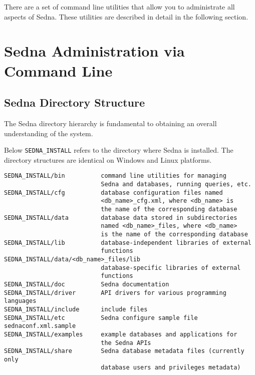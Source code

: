 \documentclass[a4paper,12pt]{article}
\begin{document}
There are a set of command line utilities that allow you to administrate all aspects of Sedna.
These utilities are described in detail in the following section.

\section{Sedna Administration via Command Line}

\subsection{Sedna Directory Structure}
\label{sec:dir-structure}
The Sedna directory hierarchy is fundamental to obtaining an overall understanding of the system. 


Below \verb!SEDNA_INSTALL! refers to the directory where Sedna is installed. The directory structures are identical on Windows and Linux platforms.

\begin{verbatim}
SEDNA_INSTALL/bin          command line utilities for managing 
                           Sedna and databases, running queries, etc.
SEDNA_INSTALL/cfg          database configuration files named 
                           <db_name>_cfg.xml, where <db_name> is 
                           the name of the corresponding database
SEDNA_INSTALL/data         database data stored in subdirectories 
                           named <db_name>_files, where <db_name> 
                           is the name of the corresponding database 									
SEDNA_INSTALL/lib          database-independent libraries of external 
                           functions
SEDNA_INSTALL/data/<db_name>_files/lib        
                           database-specific libraries of external
                           functions                  
SEDNA_INSTALL/doc          Sedna documentation
SEDNA_INSTALL/driver       API drivers for various programming languages
SEDNA_INSTALL/include      include files
SEDNA_INSTALL/etc          Sedna configure sample file sednaconf.xml.sample
SEDNA_INSTALL/examples     example databases and applications for 
                           the Sedna APIs
SEDNA_INSTALL/share        Sedna database metadata files (currently only 
                           database users and privileges metadata)
\end{verbatim}
\end{document}
